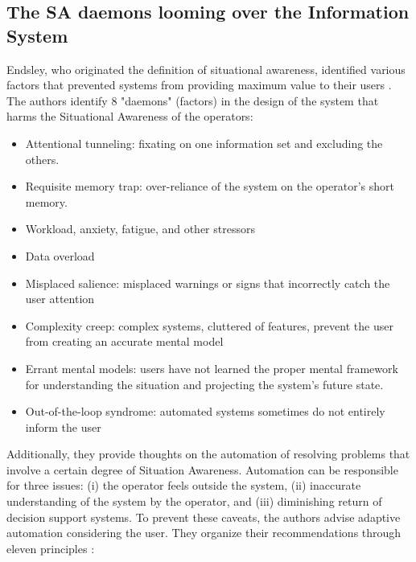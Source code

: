 \subsection{The SA daemons looming over the Information System}
Endsley, who originated the definition of situational awareness, identified various factors that prevented systems from providing maximum value to their users \parencite{endsleyDesigningSituationAwareness2016}.
The authors identify 8 "daemons" (factors) in the design of the system that harms the Situational Awareness of the operators:

\begin{itemize}
    \item Attentional tunneling: fixating on one information set and excluding the others.
    \item Requisite memory trap: over-reliance of the system on the operator's short memory.
    \item Workload, anxiety, fatigue, and other stressors
    \item Data overload
    \item Misplaced salience: misplaced warnings or signs that incorrectly catch the user attention
    \item Complexity creep: complex systems, cluttered of features, prevent the user from creating an accurate mental model
    \item Errant mental models: users have not learned the proper mental framework for understanding the situation and projecting the system's future state.
    \item Out-of-the-loop syndrome: automated systems sometimes do not entirely inform the user
\end{itemize}

Additionally, they provide thoughts on the automation of resolving problems that involve a certain degree of Situation Awareness.
Automation can be responsible for three issues: (i) the operator feels outside the system, (ii) inaccurate understanding of the system by the operator, and (iii) diminishing return of decision support systems.
To prevent these caveats, the authors advise adaptive automation considering the user.
They organize their recommendations through eleven principles \parencite[]{endsleyDesigningSituationAwareness2016}:

